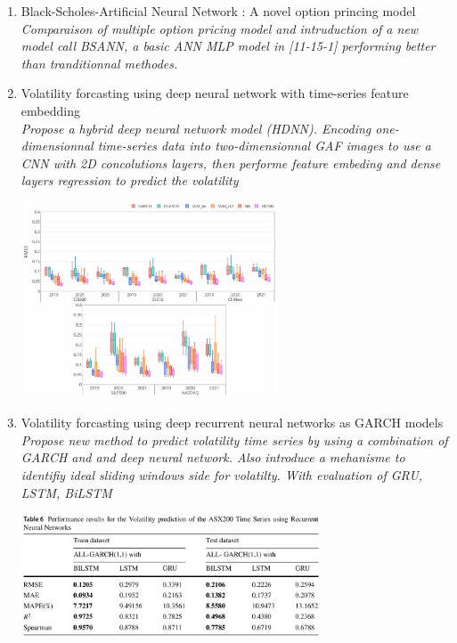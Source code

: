 \documentclass[letterpaper,11pt]{article}
\begin{document}
\begin{enumerate}
  \item Black-Scholes-Artificial Neural Network : A novel option princing model\\
  \emph{Comparaison of multiple option pricing model and intruduction of a new model call BSANN, a basic ANN MLP model in [11-15-1] performing better than tranditionnal methodes.}

  \item Volatility forcasting using deep neural network with time-series feature embedding\\
  \emph{Propose a hybrid deep neural network model (HDNN). Encoding one-dimensionnal time-series data into two-dimensionnal GAF images to use a CNN with 2D concolutions layers, then performe feature embeding  and dense layers regression to predict the volatility}
  \begin{center}
    \includegraphics[width=0.6\textwidth]{img/res_lit_paper_3.png}
  \end{center}


  \item Volatility forcasting using deep recurrent neural networks as GARCH models\\
  \emph{Propose new method to predict volatility time series by using a combination of GARCH and and deep neural network. Also introduce a mehanisme to identifiy ideal sliding windows side for volatilty. With evaluation of GRU, LSTM, BiLSTM}
  \begin{center}
    \includegraphics[width=0.7\textwidth]{img/res_lit_paper_4.png}
  \end{center}


\end{enumerate}
\end{document}
